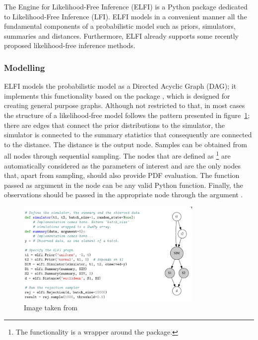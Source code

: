 The Engine for Likelihood-Free Inference (ELFI) \autocite{1708.00707}
is a Python package dedicated to Likelihood-Free Inference (LFI). ELFI
models in a convenient manner all the fundamental components of a
probabilistic model such as priors, simulators, summaries and
distances. Furthermore, ELFI already supports some recently proposed
likelihood-free inference methods.

\subsubsection{Modelling}
\label{sec:modelling}

ELFI models the probabilistic model as a Directed Acyclic Graph (DAG);
it implements this functionality based on the package
, which is designed for creating general purpose
graphs. Although not restricted to that, in most cases the structure
of a likelihood-free model follows the pattern presented in
figure~\ref{fig:elfi}; there are edges that connect the prior
distributions to the simulator, the simulator is connected to the
summary statistics that consequently are connected to the
distance. The distance is the output node. Samples can be obtained
from all nodes through sequential sampling. The nodes that are defined
as \footnote{The  functionality
  is a wrapper around the  package.} are automatically
considered as the parameters of interest and are the only nodes that,
apart from sampling, should also provide PDF evaluation. The function
passed as argument in the  node can be any valid
Python function. Finally, the observations should be passed in the
appropriate node through the argument .

\begin{figure}[!ht]
    \begin{center}
      \includegraphics[width=0.8\textwidth]{./Thesis/images/chapter2/elfi.png}
    \end{center}
    \caption{Image taken from \cite{1708.00707}}
    \label{fig:elfi}
\end{figure}


